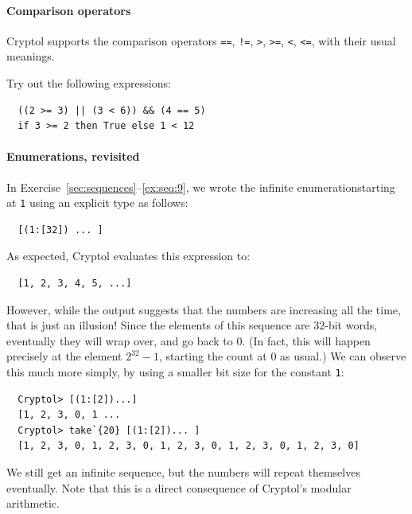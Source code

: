 \paragraph*{Comparison operators} Cryptol supports the comparison
operators {\tt ==}, {\tt !=}, {\tt >}, {\tt >=}, {\tt <}, {\tt <=},
with their usual meanings.\indEq\indNeq\indGt\indGte\indLt\indLte

\begin{Exercise}\label{ex:arith:8}
Try out the following expressions:
\begin{Verbatim}
  ((2 >= 3) || (3 < 6)) && (4 == 5)
  if 3 >= 2 then True else 1 < 12
\end{Verbatim}
\end{Exercise}

\paragraph*{Enumerations, revisited} In
Exercise~\ref{sec:sequences}--\ref{ex:seq:9}, we wrote the infinite
enumeration\indEnum\indInfSeq starting at {\tt 1} using an explicit
type as follows:
\begin{Verbatim}
  [(1:[32]) ... ]
\end{Verbatim}
As expected, Cryptol evaluates this expression to:
\begin{Verbatim}
  [1, 2, 3, 4, 5, ...]
\end{Verbatim}
However, while the output suggests that the numbers are increasing all
the time, that is just an illusion! Since the elements of this
sequence are 32-bit words, eventually they will wrap over, and go back
to 0. (In fact, this will happen precisely at the element $2^{32}-1$,
starting the count at $0$ as usual.) We can observe this much more
simply, by using a smaller bit size for the constant {\tt 1}:
\begin{Verbatim}
  Cryptol> [(1:[2])...]
  [1, 2, 3, 0, 1 ...
  Cryptol> take`{20} [(1:[2])... ]
  [1, 2, 3, 0, 1, 2, 3, 0, 1, 2, 3, 0, 1, 2, 3, 0, 1, 2, 3, 0]
\end{Verbatim}
We still get an infinite sequence, but the numbers will repeat
themselves eventually. Note that this is a direct consequence of
Cryptol's modular arithmetic.\indModular

